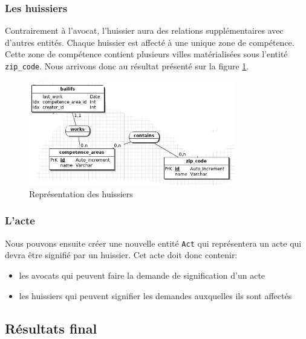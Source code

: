 \documentclass[]{report}
\begin{document}
      \subsubsection{Les huissiers}

        Contrairement à l'avocat, l'huissier aura des relations supplémentaires avec d'autres entités. Chaque huissier est affecté à une unique zone de compétence. Cette zone de compétence contient plusieurs villes matérialisées sous l'entité \verb|zip_code|. Nous arrivons donc au résultat présenté sur la figure \ref{merise_bailiffs}.

        \begin{figure}[h!]
          \centering
          \includegraphics[width=0.8\textwidth]{img/merise_bailiffs.png}
          \caption{Représentation des huissiers}
          \label{merise_bailiffs}
        \end{figure}

      \subsubsection{L'acte}

        Nous pouvons ensuite créer une nouvelle entité \verb|Act| qui représentera un acte qui devra être signifié par un huissier. Cet acte doit donc contenir:

        \begin{itemize}
          \item les avocats qui peuvent faire la demande de signification d'un acte
          \item les huissiers qui peuvent signifier les demandes auxquelles ils sont affectés
        \end{itemize}

    \subsection{Résultats final}
\end{document}

